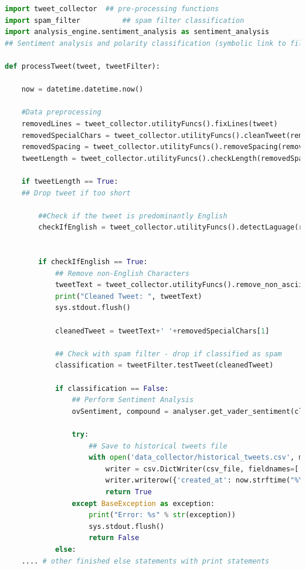 \documentclass[oneside, 12pt]{article}
\begin{document}
			\begin{lstlisting}[language=Python, caption=Sift-text python script - used alongside Curl command in Listing 4]
import tweet_collector	## pre-processing functions
import spam_filter			## spam filter classification
import analysis_engine.sentiment_analysis as sentiment_analysis	
## Sentiment analysis and polarity classification (symbolic link to file)
			
def processTweet(tweet, tweetFilter):
			
	now = datetime.datetime.now()
				
	#Data preprocessing
	removedLines = tweet_collector.utilityFuncs().fixLines(tweet)
	removedSpecialChars = tweet_collector.utilityFuncs().cleanTweet(removedLines)
	removedSpacing = tweet_collector.utilityFuncs().removeSpacing(removedSpecialChars[0])
	tweetLength = tweet_collector.utilityFuncs().checkLength(removedSpacing)
			
	if tweetLength == True:
	## Drop tweet if too short
				
		##Check if the tweet is predominantly English				
		checkIfEnglish = tweet_collector.utilityFuncs().detectLaguage(removedSpecialChars[0])
			
			
		if checkIfEnglish == True:
			## Remove non-English Characters
			tweetText = tweet_collector.utilityFuncs().remove_non_ascii(removedSpacing)
			print("Cleaned Tweet: ", tweetText)
			sys.stdout.flush()
			
			cleanedTweet = tweetText+' '+removedSpecialChars[1]
			
			## Check with spam filter - drop if classified as spam
			classification = tweetFilter.testTweet(cleanedTweet)
			
			if classification == False:
				## Perform Sentiment Analysis
				ovSentiment, compound = analyser.get_vader_sentiment(cleanedTweet)
							
				try:
					## Save to historical tweets file
					with open('data_collector/historical_tweets.csv', mode='a') as csv_file:
						writer = csv.DictWriter(csv_file, fieldnames=['created_at', 'tweet', 'sentiment', 'compound'])
						writer.writerow({'created_at': now.strftime("%Y-%m-%d %H:%M"), 'tweet': cleanedTweet, 'sentiment': ovSentiment, 'compound': compound})
						return True
				except BaseException as exception:
					print("Error: %s" % str(exception))
					sys.stdout.flush()
					return False
			else:
	.... # other finished else statements with print statements
			\end{lstlisting}
			
\end{document}
